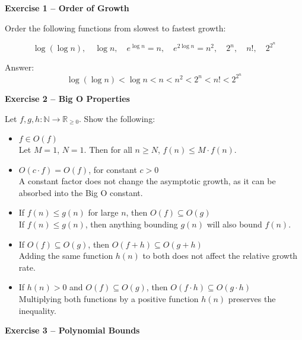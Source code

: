 \documentclass{article}
\theoremstyle{theorem}
\theoremstyle{definition}
\theoremstyle{remark}
\begin{document}
\textbf{Exercise 1 – Order of Growth}

Order the following functions from slowest to fastest growth:

\[
\log(\log n), \quad \log n, \quad e^{\log n} = n, \quad e^{2\log n} = n^2, \quad 2^n, \quad n!, \quad 2^{2^n}
\]

Answer:
\[
\log(\log n) < \log n < n < n^2 < 2^n < n! < 2^{2^n}
\]

\vspace{1em}

\textbf{Exercise 2 – Big O Properties}

Let \( f, g, h : \mathbb{N} \rightarrow \mathbb{R}_{\geq 0} \). Show the following:

\begin{itemize}
    \item \( f \in O(f) \) \\
    Let \( M = 1 \), \( N = 1 \). Then for all \( n \geq N \), \( f(n) \leq M \cdot f(n) \).

    \item \( O(c \cdot f) = O(f) \), for constant \( c > 0 \) \\
    A constant factor does not change the asymptotic growth, as it can be absorbed into the Big O constant.

    \item If \( f(n) \leq g(n) \) for large \( n \), then \( O(f) \subseteq O(g) \) \\
    If \( f(n) \leq g(n) \), then anything bounding \( g(n) \) will also bound \( f(n) \).

    \item If \( O(f) \subseteq O(g) \), then \( O(f + h) \subseteq O(g + h) \) \\
    Adding the same function \( h(n) \) to both does not affect the relative growth rate.

    \item If \( h(n) > 0 \) and \( O(f) \subseteq O(g) \), then \( O(f \cdot h) \subseteq O(g \cdot h) \) \\
    Multiplying both functions by a positive function \( h(n) \) preserves the inequality.
\end{itemize}

\vspace{1em}

\textbf{Exercise 3 – Polynomial Bounds}
\end{document}

